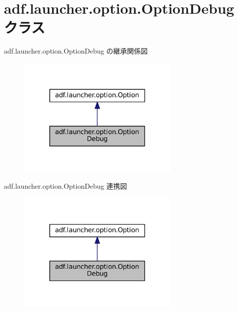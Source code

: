 \hypertarget{classadf_1_1launcher_1_1option_1_1OptionDebug}{}\section{adf.\+launcher.\+option.\+Option\+Debug クラス}
\label{classadf_1_1launcher_1_1option_1_1OptionDebug}


adf.\+launcher.\+option.\+Option\+Debug の継承関係図
\nopagebreak
\begin{figure}[H]
\begin{center}
\leavevmode
\includegraphics[width=225pt]{classadf_1_1launcher_1_1option_1_1OptionDebug__inherit__graph}
\end{center}
\end{figure}


adf.\+launcher.\+option.\+Option\+Debug 連携図
\nopagebreak
\begin{figure}[H]
\begin{center}
\leavevmode
\includegraphics[width=225pt]{classadf_1_1launcher_1_1option_1_1OptionDebug__coll__graph}
\end{center}
\end{figure}
